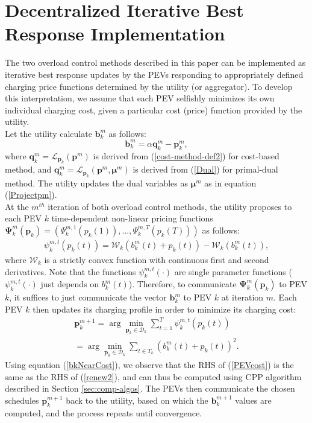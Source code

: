 \documentclass[12pt,draftcls,onecolumn]{IEEEtran}
\begin{document}
\section{Decentralized Iterative Best Response Implementation}\label{BestResponse}
\indent The two overload control methods described in this paper can be implemented as iterative best response updates by the PEVs responding to appropriately defined charging price functions determined by the utility (or aggregator). To develop this interpretation, we assume that each PEV selfishly minimizes its own individual charging cost, given a particular cost (price) function provided by the utility.\\
\indent Let the utility calculate $\mathbf{b}^{m}_k$ as follows:
\begin{equation}
\mathbf{b}^{m}_k = \alpha \mathbf{q}^{m}_k - \mathbf{p}^{m}_k,
\label{bkNearCost}
\end{equation}
where $\mathbf{q}_k^m=\mathcal{L}_{\mathbf{p}_k}(\mathbf{p}^{m})$ is derived from (\ref{cost-method-def2}) for cost-based method, and $\mathbf{q}_k^m=\mathcal{L}_{\mathbf{p}_k}(\mathbf{p}^{m}, \mathbf{\mu}^{m})$ is derived from (\ref{Dual}) for primal-dual method. The utility updates the dual variables as $\mathbf{\mu}^{m}$ as in equation (\ref{Projectpm}).\\
\indent At the $m^{th}$ iteration of both overload control methods, the utility proposes to each PEV $k$ time-dependent non-linear pricing functions $\mathbf{\Psi}_k^m(\mathbf{p}_k)=(\Psi_{k}^{m,1}(p_k(1)), ..., \Psi_{k}^{m,T}(p_k(T)))$ as follows:
\begin{gather}
\psi_k^{m,t}(p_k(t))=\mathcal{W}_k\left(b_k^{m}(t)+p_k(t)\right)-\mathcal{W}_k\left(b_k^{m}(t)\right),
\label{psikmNear}
\end{gather}
where $\mathcal{W}_k$ is a strictly convex function with continuous first and second derivatives. Note that the functions $\psi_k^{m,t}(\cdot)$ are single parameter functions ($\psi_k^{m,t}(\cdot)$ just depends on $b_k^{m}(t)$). Therefore, to communicate $\mathbf{\Psi}_k^m(\mathbf{p}_k)$ to PEV $k$, it suffices to just communicate the vector $\mathbf{b}_k^m$ to PEV $k$ at iteration $m$. Each PEV $k$ then updates its charging profile in order to minimize its charging cost:
\begin{gather}
\mathbf{p}_k^{m+1}=\arg\min_{\mathbf{p}_k \in \mathcal{D}_k}\sum_{t=1}^{T}\psi_{k}^{m,t}(p_k(t)) \nonumber \\
=\arg\min_{\mathbf{p}_k \in \mathcal{D}_k}\sum_{t \in T_k}\left(b_k^{m}(t)+p_k(t)\right)^2.
\label{PEVcost}
\end{gather}
Using equation (\ref{bkNearCost}), we observe that the RHS of (\ref{PEVcost}) is the same as the RHS of (\ref{renew2}), and can thus be computed using CPP algorithm described in Section \ref{sec:comp-algos}. The PEVs then communicate the chosen schedules $\mathbf{p}_k^{m+1}$ back to the utility, based on which the $\mathbf{b}^{m+1}_k$ values are computed, and the process repeats until convergence.
\end{document}
